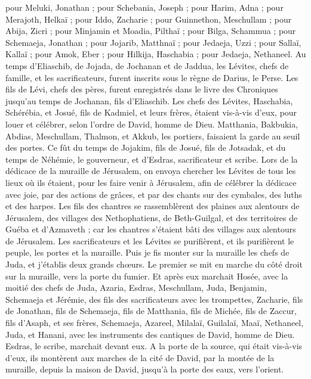 \begin{multicols}{2}
pour Meluki, Jonathan ; pour Schebania, Joseph ;
pour Harim, Adna ; pour Merajoth, Helkaï ;
pour Iddo, Zacharie ; pour Guinnethon, Meschullam ;
pour Abija, Zicri ; pour Minjamin et Moadia, Pilthaï ;
pour Bilga, Schammua ; pour Schemaeja, Jonathan ;
pour Jojarib, Matthnaï ; pour Jedaeja, Uzzi ;
pour Sallaï, Kallaï ; pour Amok, Eber ;
pour Hilkija, Haschabia ; pour Jedaeja, Nethaneel.
Au temps d'Eliaschib, de Jojada, de Jochanan et de Jaddua, les Lévites, chefs de famille, et les sacrificateurs, furent inscrits sous le règne de Darius, le Perse.
Les fils de Lévi, chefs des pères, furent enregistrés dans le livre des Chroniques jusqu'au temps de Jochanan, fils d'Eliaschib.
Les chefs des Lévites, Haschabia, Schérébia, et Josué, fils de Kadmiel, et leurs frères, étaient vis-à-vis d'eux, pour louer et célébrer, selon l’ordre de David, homme de Dieu.
Matthania, Bakbukia, Abdias, Meschullam, Thalmon, et Akkub, les portiers, faisaient la garde au seuil des portes.
Ce fût du temps de Jojakim, fils de Josué, fils de Jotsadak, et du temps de Néhémie, le gouverneur, et d'Esdras, sacrificateur et scribe.
Lors de la dédicace de la muraille de Jérusalem, on envoya chercher les Lévites de tous les lieux où ils étaient, pour les faire venir à Jérusalem, afin de célébrer la dédicace avec joie, par des actions de grâces, et par des chants sur des cymbales, des luths et des harpes.
Les fils des chantres se rassemblèrent des plaines aux alentours de Jérusalem, des villages des Nethophatiens,
de Beth-Guilgal, et des territoires de Guéba et d'Azmaveth ; car les chantres s'étaient bâti des villages aux alentours de Jérusalem.
Les sacrificateurs et les Lévites se purifièrent, et ils purifièrent le peuple, les portes et la muraille.
Puis je fis monter sur la muraille les chefs de Juda, et j'établis deux grands chœurs. Le premier se mit en marche du côté droit sur la muraille, vers la porte du fumier.
Et après eux marchait Hosée, avec la moitié des chefs de Juda,
Azaria, Esdras, Meschullam,
Juda, Benjamin, Schemaeja et Jérémie,
des fils des sacrificateurs avec les trompettes, Zacharie, fils de Jonathan, fils de Schemaeja, fils de Matthania, fils de Michée, fils de Zaccur, fils d'Asaph,
et ses frères, Schemaeja, Azareel, Milalaï, Guilalaï, Maaï, Nethaneel, Juda, et Hanani, avec les instruments des cantiques de David, homme de Dieu. Esdras, le scribe, marchait devant eux.
A la porte de la source, qui était vis-à-vis d'eux, ils montèrent aux marches de la cité de David, par la montée de la muraille, depuis la maison de David, jusqu'à la porte des eaux, vers l'orient.

\end{multicols}
